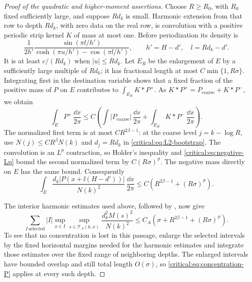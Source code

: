 \begin{proof}[Proof of the quadratic and higher-moment assertions]
Choose \(R\ge R_0\), with \(R_0\) fixed sufficiently large, and
suppose \(Rd_k\) is small. Harmonic extension from that row to depth
\(Rd_k\), with zero data on the real row, is convolution with a
positive periodic strip kernel \(K\) of mass at most one. Before
periodization its density is
\begin{equation}\label{critical:eq:strip-kernel}
 \frac1{2h'}
 \frac{\sin(\pi l/h')}
      {\cosh(\pi u/h')-\cos(\pi l/h')},
 \qquad h'=H-d',\quad l=Rd_k-d'.
\end{equation}
It is at least \(c/(Rd_k)\) when \(|u|\le Rd_k\). Let \(E_R\)
be the enlargement of \(E\) by a sufficiently large multiple of
\(Rd_k\); it has fractional length at most
\(C\min\{1,R\sigma\}\). Integrating first in the destination
variable shows that a fixed fraction of the positive mass of \(P\)
on \(E\) contributes to \(\int_{E_R}K*P^+\). As
\(K*P^+=P_{\mathrm{coarse}}+K*P^-\), we obtain
\begin{equation}\label{critical:eq:selected-P-plus}
 \int_E P^+\,\frac{\dd x}{2\pi}
 \le C\left(\int |P_{\mathrm{coarse}}|\,\frac{\dd x}{2\pi}
                  +\int_{E_R}K*P^-\,\frac{\dd x}{2\pi}\right).
\end{equation}
The normalized first term is at most \(CR^{2\beta-1}\): at the
coarse level \(j=k-\log R\), use
\(N(j)\le C R^\beta N(k)\) and \(d_j=Rd_k\) in
\eqref{critical:eq:L2-bootstrap}. The convolution is an \(L^p\)
contraction, so Holder's inequality and
\eqref{critical:eq:negative-Lp} bound the second normalized term by
\(C(R\sigma)^\vartheta\). The negative mass directly on \(E\)
has the same bound. Consequently
\begin{equation}\label{critical:eq:concentration-P}
 \int_E\frac{d_k|P(x+\ii(H-d'))|}{N(k)^2}
                \,\frac{\dd x}{2\pi}
 \le C\left(R^{2\beta-1}+(R\sigma)^\vartheta\right).
\end{equation}

The interior harmonic estimates used above, followed by
, now give
\begin{equation}\label{critical:eq:concentration-M}
 \sum_{I\ \mathrm{selected}} |I|
       \sup_{x\in I}\sup_{s\in\mathcal T_A(k,x)}
                  \frac{d_k^2M(s)^2}{N(k)^2}
 \le C_A\left(\sigma+R^{2\beta-1}+(R\sigma)^\vartheta\right).
\end{equation}
To see that no concentration is lost in this passage, enlarge the
selected intervals by the fixed horizontal margins needed for the
harmonic estimates and integrate those estimates over the fixed
range of neighboring depths. The enlarged intervals have bounded
overlap and still total length \(O(\sigma)\), so
\eqref{critical:eq:concentration-P} applies at every such depth.


\end{proof}
